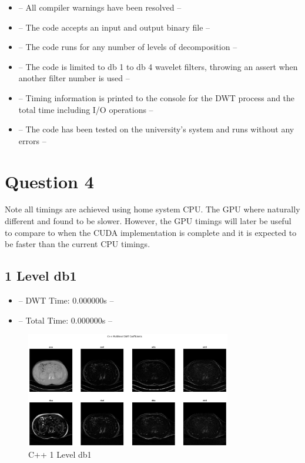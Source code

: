 \documentclass{article}
\begin{document}
\begin{itemize}
    \item -- All compiler warnings have been resolved --
    \item -- The code accepts an input and output binary file --
    \item -- The code runs for any number of levels of decomposition --
    \item -- The code is limited to db 1 to db 4 wavelet filters, throwing an assert when another filter number is used --
    \item -- Timing information is printed to the console for the DWT process and the total time including I/O operations --
    \item -- The code has been tested on the university's system and runs without any errors --
\end{itemize}

\pagebreak

\section{Question 4}

Note all timings are achieved using home system CPU. The GPU where naturally different and found to be slower. However, the GPU timings will later be useful to compare to when the CUDA implementation is complete and it is expected to be faster than the current CPU timings.\\

\subsection{1 Level db1}
\begin{itemize}
    \item -- DWT Time: 0.000000s --
    \item -- Total Time: 0.000000s --
\end{itemize}

\begin{figure}[H]
    \centering
    \includegraphics[width=0.8\textwidth]{assets/cpp-1-db1.png}
    \caption{C++ 1 Level db1}
    \label{fig9}
\end{figure}
\end{document}
